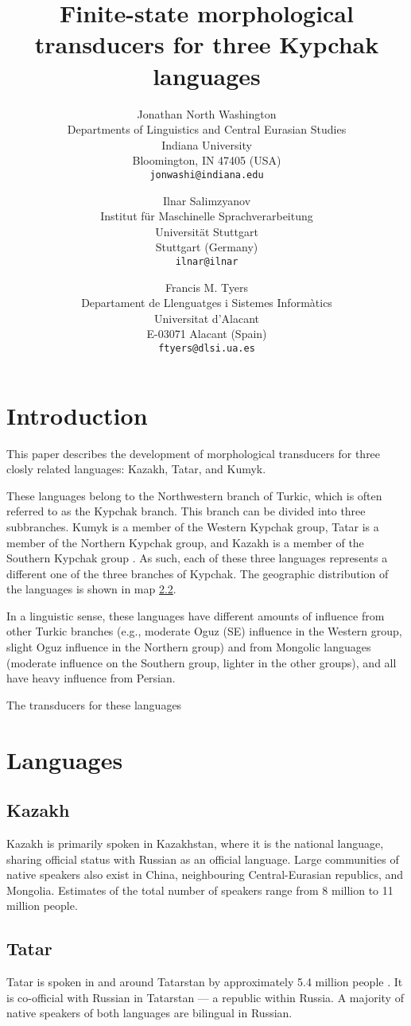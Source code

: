 \documentclass[a4paper,11pt,twocolumn]{article}
\title{Finite-state morphological transducers for three Kypchak languages}
\author{Jonathan North Washington \\
Departments of Linguistics and Central Eurasian Studies\\
Indiana University\\
Bloomington, IN 47405 (USA)\\
\texttt{jonwashi@indiana.edu} \and
Ilnar Salimzyanov  \\
Institut für Maschinelle Sprachverarbeitung \\
Universität Stuttgart\\
Stuttgart (Germany) \\
\texttt{ilnar@ilnar} \and 
Francis M. Tyers\\
Departament de Llenguatges i Sistemes Informàtics \\  
Universitat d'Alacant\\
E-03071 Alacant (Spain)\\
\texttt{ftyers@dlsi.ua.es} 
}
\begin{document}
\maketitleabstract{}

\section{Introduction}

This paper describes the development of morphological transducers for three closly related languages: Kazakh, Tatar, and Kumyk.

These languages belong to the Northwestern branch of Turkic, which is often referred to as the Kypchak branch.  This branch can be divided into three subbranches.  Kumyk is a member of the Western Kypchak group, Tatar is a member of the Northern Kypchak group, and Kazakh is a member of the Southern Kypchak group \citep[82-83]{histofturkic}.  As such, each of these three languages represents a different one of the three branches of Kypchak.  The geographic distribution of the languages is shown in map \ref{}.

In a linguistic sense, these languages have different amounts of influence from other Turkic branches (e.g., moderate Oguz (SE) influence in the Western group, slight Oguz influence in the Northern group) and from Mongolic languages (moderate influence on the Southern group, lighter in the other groups), and all have heavy influence from Persian.

\cite{washington2012}
\cite{salimzyanov2013}
\cite{bekmanova2013}

The transducers for these languages 

\section{Languages}

\subsection{Kazakh}
Kazakh is primarily spoken in Kazakhstan, where it is the national language, sharing official status with Russian as an official language.  Large communities of native speakers also exist in China, neighbouring Central-Eurasian republics, and Mongolia.  Estimates of the total number of speakers range from 8 million \citep{ethnologue} to 11 million \citet{encyclopedin} people.

\subsection{Tatar}
Tatar is spoken in and around Tatarstan by approximately 5.4 million people \citep{ethnologue}. It is co-official with Russian in Tatarstan --- a republic within Russia.  A majority of native speakers of both languages are bilingual in Russian. %
\end{document}
